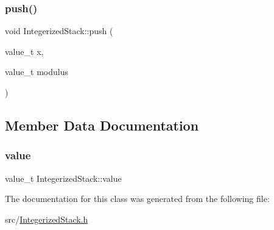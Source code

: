 \mbox{\label{class_integerized_stack_affd28eb928362de80e35cd4e1ecdf96b}} 
\subsubsection{\texorpdfstring{push()}{push()}\hspace{0.1cm}{\footnotesize\ttfamily [2/2]}}
{\footnotesize\ttfamily void Integerized\+Stack\+::push (\begin{DoxyParamCaption}\item[{value\+\_\+t}]{x,  }\item[{value\+\_\+t}]{modulus }\end{DoxyParamCaption})\hspace{0.3cm}{\ttfamily [inline]}}



\subsection{Member Data Documentation}
\mbox{\label{class_integerized_stack_afcfb2d32d51c88b556f3bb7ff2544be5}} 
\subsubsection{\texorpdfstring{value}{value}}
{\footnotesize\ttfamily value\+\_\+t Integerized\+Stack\+::value\hspace{0.3cm}{\ttfamily [protected]}}



The documentation for this class was generated from the following file\+:\begin{DoxyCompactItemize}
\item 
src/\hyperlink{_integerized_stack_8h}{Integerized\+Stack.\+h}\end{DoxyCompactItemize}
